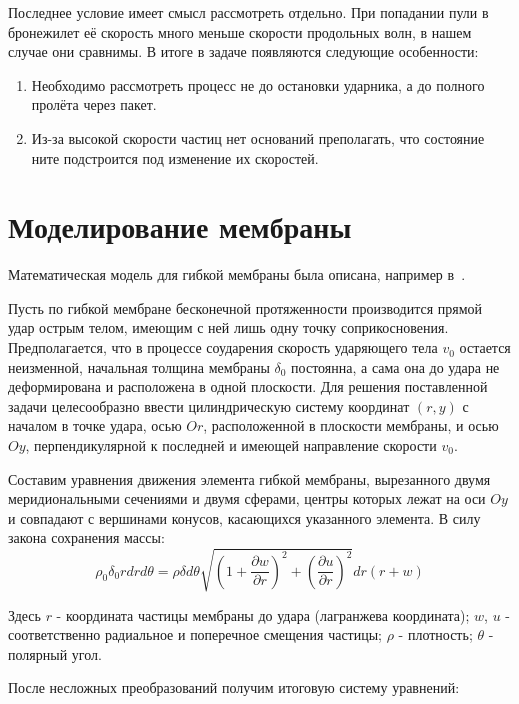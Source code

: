 Последнее условие имеет смысл рассмотреть отдельно.
При попадании пули в бронежилет её скорость много меньше скорости продольных волн, в нашем случае они сравнимы.
В итоге в задаче появляются следующие особенности:
\begin{enumerate}
    \item Необходимо рассмотреть процесс не до остановки ударника, а до полного пролёта через пакет.
    \item Из-за высокой скорости частиц нет оснований преполагать, что состояние ните подстроится под изменение их скоростей.
\end{enumerate}

\section{Моделирование мембраны}\label{sec:eq-membrane}
Математическая модель для гибкой мембраны была описана, например в~\cite{rakhmatulin}.

Пусть по гибкой мембране бесконечной протяженности производится прямой удар острым телом, имеющим с ней лишь одну
точку соприкосновения.
Предполагается, что в процессе соударения скорость ударяющего тела $v_0$ остается неизменной, начальная толщина
мембраны $\delta_0$ постоянна, а сама она до удара не деформирована и расположена в одной плоскости.
Для решения поставленной задачи целесообразно ввести цилиндрическую систему координат $(r,y)$ с началом в точке удара,
осью $Or$, расположенной в плоскости мембраны, и осью $Oy$, перпендикулярной к последней и имеющей направление скорости
$v_0$.

Составим уравнения движения элемента гибкой мембраны, вырезанного двумя меридиональными сечениями и двумя сферами,
центры которых лежат на оси $Oy$ и совпадают с вершинами конусов, касающихся указанного элемента.
В силу закона сохранения массы:
\begin{equation}
    \rho_0 \delta_0 r dr d\theta = \rho \delta d\theta \sqrt{\left( 1 + \dfrac{\partial w}{\partial r} \right) ^ 2 + \left( \dfrac{\partial u}{\partial r} \right) ^ 2} dr (r + w)
\end{equation}

Здесь $r$ - координата частицы мембраны до удара (лагранжева координата); $w$, $u$ - соответственно радиальное и
поперечное смещения частицы; $\rho$ - плотность; $\theta$ - полярный угол.

После несложных преобразований получим итоговую систему уравнений:

